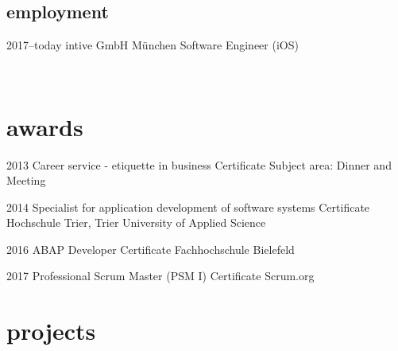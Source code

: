 \documentclass[]{friggeri-cv} %
\begin{document}
\subsection{employment}

\begin{entrylist}
	
\entry
{2017--today}
{intive GmbH}
{M\"{u}nchen}
{Software Engineer (iOS)}
	
\\ 
\end{entrylist}


\section{awards}

\begin{entrylist}


\entry
{2013}
{Career service - etiquette in business}
{Certificate}
{Subject area: Dinner and Meeting}


\entry
{2014}
{Specialist for application development of software systems}
{Certificate}
{Hochschule Trier, Trier University of Applied Science}

\entry
{2016}
{ABAP Developer}
{Certificate}
{Fachhochschule Bielefeld}

\entry
{2017}
{Professional Scrum Master (PSM I)}
{Certificate}
{Scrum.org}
\\ 
\end{entrylist}


\section{projects}
\end{document}
